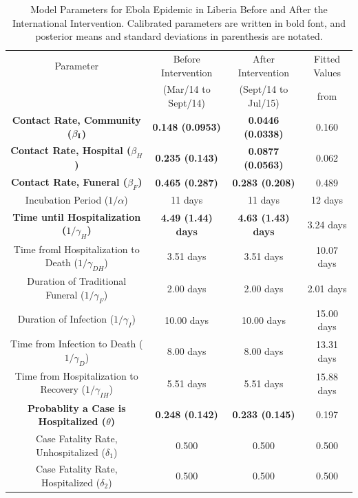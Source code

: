 \begin{table}[ht]
\caption{Model Parameters for Ebola Epidemic in Liberia Before and After the International Intervention. Calibrated parameters are written in bold font, and posterior means and standard deviations in parenthesis are notated.} %
\centering %
\begin{tabular}{c| c| c| c }
\hline\hline %
Parameter &  Before Intervention  & After Intervention & Fitted Values\\ [0.5ex]
 & (Mar/14 to Sept/14) &  (Sept/14 to Jul/15) & from \cite{FortmannRoe}\\ [0.5ex] %
\hline %
\bf {Contact Rate, Community  ($\bf{\beta_{I}}$) }& \bf{0.148 (0.0953)} & \bf{0.0446 (0.0338)} & 0.160 \\
\bf Contact Rate, Hospital  ($\beta_{H}$) &\bf 0.235 (0.143)& \bf 0.0877 (0.0563) & 0.062\\
\bf Contact Rate, Funeral  ($\beta_{F}$) & \bf 0.465 (0.287)& \bf 0.283 (0.208) & 0.489 \\
Incubation Period (${1}/{\alpha}$) & 11 days & 11 days  & 12 days\\
\bf Time until Hospitalization (${1}/{\gamma_{H}}$) &\bf 4.49 (1.44) days & \bf 4.63 (1.43) days & 3.24 days  \\
Time froml Hospitalization to Death (${1}/{\gamma_{DH}}$) & 3.51 days & 3.51 days  & 10.07 days\\
Duration of Traditional Funeral (${1}/{\gamma_{F}}$) & 2.00 days & 2.00 days  & 2.01 days\\
Duration of Infection (${1}/{\gamma_{I}}$) & 10.00 days & 10.00 days  & 15.00 days\\
Time from Infection to Death (${1}/{\gamma_{D}}$) & 8.00 days & 8.00 days  & 13.31 days\\
Time from Hospitalization to Recovery (${1}/{\gamma_{IH}}$) & 5.51 days & 5.51 days  & 15.88 days\\
\bf Probablity a Case is Hospitalized ($\theta$) & \bf 0.248 (0.142) & \bf 0.233 (0.145) & 0.197\\
Case Fatality Rate, Unhospitalized ($\delta_{1}$) & 0.500  & 0.500  &  0.500 \\
Case Fatality Rate, Hospitalized ($\delta_{2}$) & 0.500 & 0.500 & 0.500\\ [1ex]
\hline
\end{tabular}
\label{tab:parameters}
\end{table}


